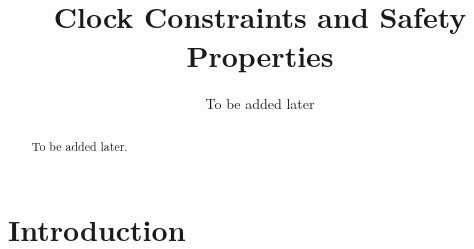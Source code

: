 \documentclass[11pt]{llncs}
\begin{document}
\title{Clock Constraints and Safety Properties}
\author{To be added later}
\maketitle
\begin{abstract}
To be added later.
\end{abstract}
\section{Introduction}
\end{document}
